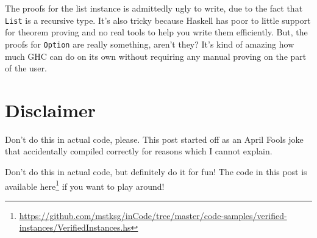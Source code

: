 \documentclass[]{article}
\renewcommand{\href}[2]{#2\footnote{\url{#1}}}
\begin{document}
The proofs for the list instance is admittedly ugly to write, due to the fact
that \texttt{List} is a recursive type. It's also tricky because Haskell has
poor to little support for theorem proving and no real tools to help you write
them efficiently. But, the proofs for \texttt{Option} are really something,
aren't they? It's kind of amazing how much GHC can do on its own without
requiring any manual proving on the part of the user.

\section{Disclaimer}\label{disclaimer}

Don't do this in actual code, please. This post started off as an April Fools
joke that accidentally compiled correctly for reasons which I cannot explain.

Don't do this in actual code, but definitely do it for fun! The code in this
post is available
\href{https://github.com/mstksg/inCode/tree/master/code-samples/verified-instances/VerifiedInstances.hs}{here}
if you want to play around!
\end{document}
